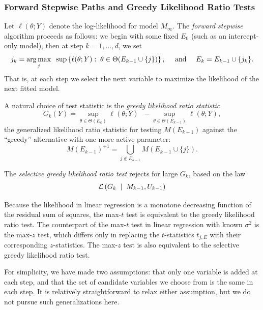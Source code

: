\documentclass{article}
\begin{document}
\subsubsection{Forward Stepwise Paths and Greedy Likelihood Ratio Tests}
Let $\ell(\theta; Y)$ denote the log-likelihood for model
$M_\infty$. The {\em forward stepwise} algorithm proceeds as follows: we begin with some fixed $E_0$ (such as an intercept-only model), then at step $k=1,\ldots,d$, we set
\begin{equation}
j_k = \operatorname*{arg\,max}_j \;\;\sup \left\{\ell(\theta; Y):\; \theta\in\Theta(E_{k-1} \cup \{j\})\right\}, \quad \text{ and } \quad
E_k = E_{k-1} \cup \{j_k\}.
\end{equation}
That is, at each step we select the next variable to maximize the likelihood of the next fitted model.

A natural choice of test statistic is the {\em greedy likelihood ratio statistic}
\begin{equation}\label{eq:greedyLRT}
G_k(Y) = \sup_{\theta\in \Theta(E_k)} {\ell(\theta; Y)} \;\;- \sup_{\theta\in \Theta(E_{k-1})} {\ell(\theta; Y)},
\end{equation}
the generalized likelihood ratio statistic for testing $M(E_{k-1})$ against the ``greedy'' alternative with one more active parameter:
\begin{equation}\label{eq:greedyAlternative}
M(E_{k-1})^{+1} = \bigcup_{j \notin E_{k-1}} M(E_{k-1} \cup \{j\}).
\end{equation}

The {\em selective greedy likelihood ratio test} rejects for large $G_k$, based on the law
\begin{equation}
\mathcal{L}\left(G_k \;\mid\; M_{k-1}, U_{k-1}\right)
\end{equation}

Because the likelihood in linear regression is a monotone decreasing function of the residual sum of squares, the max-$t$ test is equivalent to the greedy likelihood ratio test. The counterpart of the max-$t$ test in linear regression with known $\sigma^2$ is the max-$z$ test, which differs only in replacing the $t$-statistics $t_{j,E}$ with their corresponding $z$-statistics. The max-$z$ test is also equivalent to the selective greedy likelihood ratio test.

For simplicity, we have made two assumptions: that only one variable is added at each step, and that the set of candidate variables we choose from is the same in each step. It is relatively straightforward to relax either assumption, but we do not pursue such generalizations here.
\end{document}
